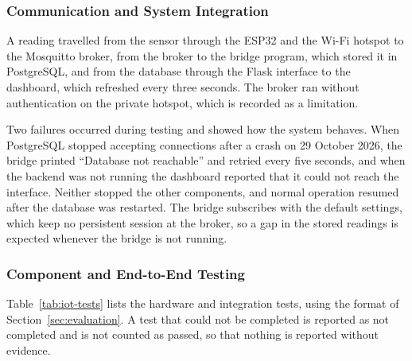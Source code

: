 \documentclass[12pt, a4paper]{article}
\begin{document}
\subsubsection{Communication and System Integration}

A reading travelled from the sensor through the ESP32 and the Wi-Fi hotspot to the Mosquitto broker, from the broker to the bridge program, which stored it in PostgreSQL, and from the database through the Flask interface to the dashboard, which refreshed every three seconds. The broker ran without authentication on the private hotspot, which is recorded as a limitation.

Two failures occurred during testing and showed how the system behaves. When PostgreSQL stopped accepting connections after a crash on 29 October 2026, the bridge printed ``Database not reachable'' and retried every five seconds, and when the backend was not running the dashboard reported that it could not reach the interface. Neither stopped the other components, and normal operation resumed after the database was restarted. The bridge subscribes with the default settings, which keep no persistent session at the broker, so a gap in the stored readings is expected whenever the bridge is not running.

\subsubsection{Component and End-to-End Testing}

Table~\ref{tab:iot-tests} lists the hardware and integration tests, using the format of Section~\ref{sec:evaluation}. A test that could not be completed is reported as not completed and is not counted as passed, so that nothing is reported without evidence.
\end{document}

